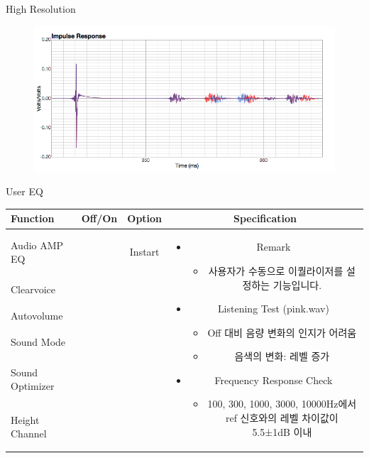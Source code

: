 \documentclass{beamer}
\begin{document}
\begin{frame}[t]{High Resolution}
\begin{figure}[b]
\includegraphics[height=0.32\textwidth]{figure/highresolution.png}
\end{figure}

\end{frame}


\begin{frame}[t]{User EQ}
\begin{tiny}
\begin{tabular}{@{}lccc@{}}
\toprule
Function & Off/On & Option & Specification \\
\midrule
Audio AMP EQ & \color{black}{Off} & Instart &
\multirow{14}{60mm}{
\begin{itemize}
\item Remark
	\begin{itemize}
	\item 사용자가 수동으로 이퀄라이저를 설정하는 기능입니다.
	\end{itemize}
\item Listening Test (pink.wav)
	\begin{itemize}
	\item Off 대비 음량 변화의 인지가 어려움
	\item 음색의 변화: 레벨 증가
	\end{itemize}
\item Frequency Response Check
  \begin{itemize}
  \item 100, 300, 1000, 3000, 10000Hz에서 ref 신호와의 레벨 차이값이 5.5±1dB 이내
  \end{itemize}
\end{itemize}
} \\
Clearvoice & \color{black}{Off} & & \\
Autovolume & \color{black}{Off} & & \\
Sound Mode & \color{black}{Off} & & \\
Sound Optimizer & \color{black}{Off} & & \\
Height Channel & \color{black}{Off} & & \\

\end{tabular}
\end{tiny}
\end{frame}
\end{document}
